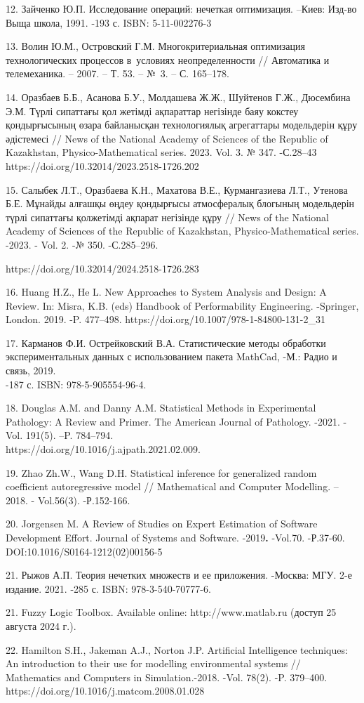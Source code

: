 \begin{noparindent}
12. Зайченко Ю.П. Исследование операций: нечеткая оптимизация. --Киев:
Изд-во Выща школа, 1991. -193 с. ISBN: 5-11-002276-3

13. Волин Ю.М., Островский Г.М. Многокритериальная оптимизация
технологических процессов в~условиях неопределенности // Автоматика и
телемеханика. -- 2007. -- Т. 53. -- №~3. -- С. 165--178.

14. Оразбаев Б.Б., Асанова Б.У., Молдашева Ж.Ж., Шуйтенов Г.Ж.,
Дюсембина Э.М. Түрлі сипаттағы қол жетімді ақпараттар негізінде баяу
кокстеу қондырғысының өзара байланысқан технологиялық агрегаттары
модельдерін құру әдістемесі // News of the National Academy of Sciences
of the Republic of Kazakhstan, Physico-Mathematical series. 2023. Vol.
3. № 347. -С.28--43\\ https://doi.org/10.32014/2023.2518-1726.202

15. Салыбек Л.Т., Оразбаева К.Н., Махатова В.Е., Курмангазиева Л.Т.,
Утенова Б.Е. Мұнайды алғашқы өңдеу қондырғысы атмосфералық блогының
модельдерін түрлі сипаттағы қолжетімді ақпарат негізінде құру // News of
the National Academy of Sciences of the Republic of Kazakhstan,
Physico-Mathematical series. -2023. - Vol. 2. -№ 350. -С.285--296.

https://doi.org/10.32014/2024.2518-1726.283

16. Huang H.Z., He L. New Approaches to System Analysis and Design: A
Review. In: Misra, K.B. (eds) Handbook of Performability Engineering.
-Springer, London. 2019. -P. 477--498.
https://doi.org/10.1007/978-1-84800-131-2\_31

17. Карманов Ф.И. Острейковский В.А. Статистические методы обработки
экспериментальных данных с использованием пакета MathCad, -М.: Радио и
связь, 2019.\\
-187 с. ISBN: 978-5-905554-96-4.

18. Douglas A.M. and Danny A.M. Statistical Methods in Experimental
Pathology: A Review and Primer. The American Journal of Pathology.
-2021. -Vol. 191(5). --P. 784--794. \\
https://doi.org/10.1016/j.ajpath.2021.02.009.

19. Zhao Zh.W., Wang D.H. Statistical inference for generalized random
coefficient autoregressive model // Mathematical and Computer Modelling.
-- 2018. - Vol.56(3). -Р.152-166.

20. Jorgensen M. A Review of Studies on Expert Estimation of Software
Development Effort. Journal of Systems and Software. -2019{\bfseries .}
-Vol.70. -Р.37-60. DOI:10.1016/S0164-1212(02)00156-5

21. Рыжов А.П. Теория нечетких множеств и ее приложения. -Москва: МГУ.
2-е издание. 2021. -285 с. ISBN: 978-3-540-70777-6.

21. Fuzzy Logic Toolbox. Available online: http://www.matlab.ru (доступ
25 августа 2024 г.).

22. Hamilton S.H., Jakeman A.J., Norton J.P. Artificial Intelligence
techniques: An introduction to their use for modelling environmental
systems // Mathematics and Computers in Simulation.-2018. -Vol. 78(2).
-P. 379--400. https://doi.org/10.1016/j.matcom.2008.01.028

\end{noparindent}

